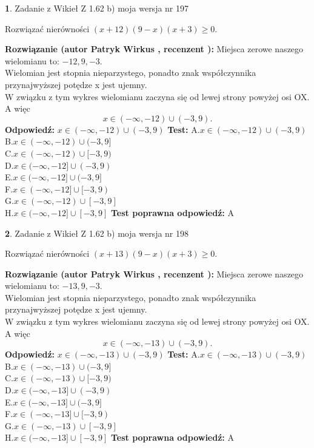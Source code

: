 \documentclass[12pt, a4paper]{article}
\theoremstyle{definition} %
\newtheorem{zad}{}
\newcommand{\zadStart}[1]{\begin{zad}#1\newline}
\newcommand{\zadStop}{\end{zad}}
\newcommand{\rozwStart}[2]{\noindent \textbf{Rozwiązanie (autor #1 , recenzent #2): }\newline}
\newcommand{\rozwStop}{\newline}
\newcommand{\odpStart}{\noindent \textbf{Odpowiedź:}\newline}
\newcommand{\odpStop}{\newline}
\newcommand{\testStart}{\noindent \textbf{Test:}\newline}
\newcommand{\testStop}{\newline}
\newcommand{\kluczStart}{\noindent \textbf{Test poprawna odpowiedź:}\newline}
\newcommand{\kluczStop}{\newline}
\begin{document}
\zadStart{Zadanie z Wikieł Z 1.62 b) moja wersja nr 197}

Rozwiązać nierówności $(x+12)(9-x)(x+3)\ge0$.
\zadStop
\rozwStart{Patryk Wirkus}{}
Miejsca zerowe naszego wielomianu to: $-12, 9, -3$.\\
Wielomian jest stopnia nieparzystego, ponadto znak współczynnika przy\linebreak najwyższej potędze x jest ujemny.\\ W związku z tym wykres wielomianu zaczyna się od lewej strony powyżej osi OX. A więc $$x \in (-\infty,-12) \cup (-3,9).$$
\rozwStop
\odpStart
$x \in (-\infty,-12) \cup (-3,9)$
\odpStop
\testStart
A.$x \in (-\infty,-12) \cup (-3,9)$\\
B.$x \in (-\infty,-12) \cup (-3,9]$\\
C.$x \in (-\infty,-12) \cup [-3,9)$\\
D.$x \in (-\infty,-12] \cup (-3,9)$\\
E.$x \in (-\infty,-12] \cup (-3,9]$\\
F.$x \in (-\infty,-12] \cup [-3,9)$\\
G.$x \in (-\infty,-12) \cup [-3,9]$\\
H.$x \in (-\infty,-12] \cup [-3,9]$
\testStop
\kluczStart
A
\kluczStop



\zadStart{Zadanie z Wikieł Z 1.62 b) moja wersja nr 198}

Rozwiązać nierówności $(x+13)(9-x)(x+3)\ge0$.
\zadStop
\rozwStart{Patryk Wirkus}{}
Miejsca zerowe naszego wielomianu to: $-13, 9, -3$.\\
Wielomian jest stopnia nieparzystego, ponadto znak współczynnika przy\linebreak najwyższej potędze x jest ujemny.\\ W związku z tym wykres wielomianu zaczyna się od lewej strony powyżej osi OX. A więc $$x \in (-\infty,-13) \cup (-3,9).$$
\rozwStop
\odpStart
$x \in (-\infty,-13) \cup (-3,9)$
\odpStop
\testStart
A.$x \in (-\infty,-13) \cup (-3,9)$\\
B.$x \in (-\infty,-13) \cup (-3,9]$\\
C.$x \in (-\infty,-13) \cup [-3,9)$\\
D.$x \in (-\infty,-13] \cup (-3,9)$\\
E.$x \in (-\infty,-13] \cup (-3,9]$\\
F.$x \in (-\infty,-13] \cup [-3,9)$\\
G.$x \in (-\infty,-13) \cup [-3,9]$\\
H.$x \in (-\infty,-13] \cup [-3,9]$
\testStop
\kluczStart
A
\kluczStop
\end{document}
